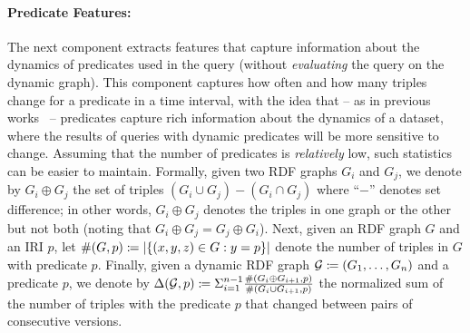 \documentclass[runningheads]{llncs}
\newcommand{\da}{\ensuremath{:\nolinebreak\mkern-1.2mu\nolinebreak=}}
\begin{document}
\paragraph{Predicate Features:} The next component extracts features that capture information about the dynamics of predicates used in the query (without \textit{evaluating} the query on the dynamic graph). This component captures how often and how many triples change for a predicate in a time interval, with the idea that -- as in previous works~\cite{UmbrichKHP12,UmbrichKPPH12,ekawUmbrichKHP12,DehghanzadehPKUHD14} -- predicates capture rich information about the dynamics of a dataset, where the results of queries with dynamic predicates will be more sensitive to change. Assuming that the number of predicates is \textit{relatively} low, such statistics can be easier to maintain. Formally, given two RDF graphs $G_i$ and $G_j$, we denote by $G_i \oplus G_j$ the set of triples $(G_i \cup G_j) - (G_i \cap G_j)$ where ``$-$'' denotes set difference; in other words, $G_i \oplus G_j$ denotes the triples in one graph or the other but not both (noting that $G_i \oplus G_j = G_j \oplus G_i$). Next, given an RDF graph $G$ and an IRI $p$, let $\#(G,p) \da |\{(x,y,z) \in G : y = p \}|$ denote the number of triples in $G$ with predicate $p$. Finally, given a dynamic RDF graph $\mathcal{G} \da ( G_1, \ldots, G_n )$ and a predicate $p$, we denote by $\Delta(\mathcal{G},p) \da \Sigma_{i=1}^{n-1}\frac{\#(G_i \oplus G_{i+1},p)}{\#(G_i \cup G_{i+1},p)}$ the normalized sum of the number of triples with the predicate $p$ that changed between pairs of consecutive versions.
\end{document}
